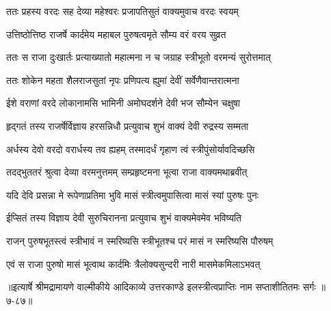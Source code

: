 \twolineshloka
{ततः प्रहस्य वरदः सह देव्या महेश्वरः}
{प्रजापतिसुतं वाक्यमुवाच वरदः स्वयम्} %

\twolineshloka
{उत्तिष्ठोत्तिष्ठ राजर्षे कार्दमेय महाबल}
{पुरुषत्वमृते सौम्य वरं वरय सुव्रत} %

\twolineshloka
{ततः स राजा दुःखार्तः प्रत्याख्यातो महात्मना}
{न च जग्राह स्त्रीभूतो वरमन्यं सुरोत्तमात्} %

\twolineshloka
{ततः शोकेन महता शैलराजसुतां नृपः}
{प्रणिपत्य ह्युमां देवीं सर्वेणैवान्तरात्मना} %

\twolineshloka
{ईशे वराणां वरदे लोकानामसि भामिनी}
{अमोघदर्शने देवी भज सौम्येन चक्षुषा} %

\twolineshloka
{हृद्गतं तस्य राजर्षेर्विज्ञाय हरसन्निधौ}
{प्रत्युवाच शुभं वाक्यं देवी रुद्रस्य सम्मता} %

\twolineshloka
{अर्धस्य देवो वरदो वरार्धस्य तव ह्यहम्}
{तस्मादर्धं गृहाण त्वं स्त्रीपुंसोर्यावदिच्छसि} %

\twolineshloka
{तदद्भुततरं श्रुत्वा देव्या वरमनुत्तमम्}
{सम्प्रहृष्टमना भूत्वा राजा वाक्यमथाब्रवीत्} %

\twolineshloka
{यदि देवि प्रसन्ना मे रूपेणाप्रतिमा भुवि}
{मासं स्त्रीत्वमुपासित्वा मासं स्यां पुरुषः पुनः} %

\twolineshloka
{ईप्सितं तस्य विज्ञाय देवी सुरुचिरानना}
{प्रत्युवाच शुभं वाक्यमेवमेव भविष्यति} %

\twolineshloka
{राजन् पुरुषभूतस्त्वं स्त्रीभावं न स्मरिष्यसि}
{स्त्रीभूतश्च परं मासं न स्मरिष्यसि पौरुषम्} %

\twolineshloka
{एवं स राजा पुरुषो मासं भूत्वाथ कार्दमिः}
{त्रैलोक्यसुन्दरी नारी मासमेकमिलाऽभवत्} %


॥इत्यार्षे श्रीमद्रामायणे वाल्मीकीये आदिकाव्ये उत्तरकाण्डे इलस्त्रीत्वप्राप्तिः नाम सप्ताशीतितमः सर्गः ॥७-८७॥
